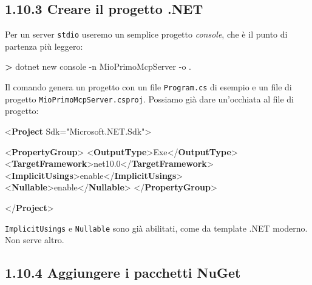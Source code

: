 \documentclass[
  italian,
  10pt,
]{book}
\newenvironment{Shaded}{\begin{snugshade}}{\end{snugshade}}
\newcommand{\AttributeTok}[1]{\textcolor[rgb]{0.13,0.29,0.53}{#1}}
\newcommand{\ExtensionTok}[1]{#1}
\newcommand{\KeywordTok}[1]{\textcolor[rgb]{0.13,0.29,0.53}{\textbf{#1}}}
\newcommand{\NormalTok}[1]{#1}
\newcommand{\OperatorTok}[1]{\textcolor[rgb]{0.81,0.36,0.00}{\textbf{#1}}}
\newcommand{\OtherTok}[1]{\textcolor[rgb]{0.56,0.35,0.01}{#1}}
\newcommand{\StringTok}[1]{\textcolor[rgb]{0.31,0.60,0.02}{#1}}
\begin{document}
\subsection{1.10.3 Creare il progetto
.NET}\label{creare-il-progetto-.net}

Per un server \texttt{stdio} useremo un semplice progetto
\emph{console}, che è il punto di partenza più leggero:

\begin{Shaded}
\begin{Highlighting}[]
\OperatorTok{\textgreater{}}\NormalTok{ dotnet }\ExtensionTok{new}\NormalTok{ console }\AttributeTok{{-}n}\NormalTok{ MioPrimoMcpServer }\AttributeTok{{-}o}\NormalTok{ .}
\end{Highlighting}
\end{Shaded}

Il comando genera un progetto con un file \texttt{Program.cs} di esempio
e un file di progetto \texttt{MioPrimoMcpServer.csproj}. Possiamo già
dare un'occhiata al file di progetto:

\begin{Shaded}
\begin{Highlighting}[]
\NormalTok{\textless{}}\KeywordTok{Project} \OtherTok{Sdk=}\StringTok{"Microsoft.NET.Sdk"}\NormalTok{\textgreater{}}

\NormalTok{  \textless{}}\KeywordTok{PropertyGroup}\NormalTok{\textgreater{}}
\NormalTok{    \textless{}}\KeywordTok{OutputType}\NormalTok{\textgreater{}Exe\textless{}/}\KeywordTok{OutputType}\NormalTok{\textgreater{}}
\NormalTok{    \textless{}}\KeywordTok{TargetFramework}\NormalTok{\textgreater{}net10.0\textless{}/}\KeywordTok{TargetFramework}\NormalTok{\textgreater{}}
\NormalTok{    \textless{}}\KeywordTok{ImplicitUsings}\NormalTok{\textgreater{}enable\textless{}/}\KeywordTok{ImplicitUsings}\NormalTok{\textgreater{}}
\NormalTok{    \textless{}}\KeywordTok{Nullable}\NormalTok{\textgreater{}enable\textless{}/}\KeywordTok{Nullable}\NormalTok{\textgreater{}}
\NormalTok{  \textless{}/}\KeywordTok{PropertyGroup}\NormalTok{\textgreater{}}

\NormalTok{\textless{}/}\KeywordTok{Project}\NormalTok{\textgreater{}}
\end{Highlighting}
\end{Shaded}

\texttt{ImplicitUsings} e \texttt{Nullable} sono già abilitati, come da
template .NET moderno. Non serve altro.

\subsection{1.10.4 Aggiungere i pacchetti
NuGet}\label{aggiungere-i-pacchetti-nuget}
\end{document}
